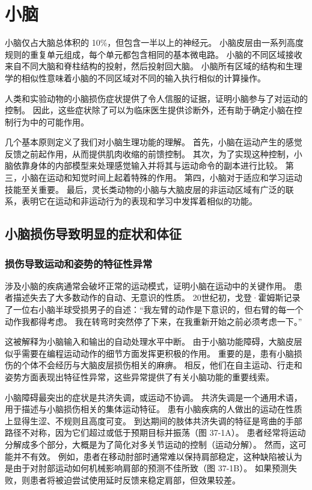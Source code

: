 \chapter{小脑}

小脑仅占大脑总体积的 10\%，但包含一半以上的神经元。 小脑皮层由一系列高度规则的重复单元组成，每个单元都包含相同的基本微电路。 小脑的不同区域接收来自不同大脑和脊柱结构的投射，然后投射回大脑。 小脑所有区域的结构和生理学的相似性意味着小脑的不同区域对不同的输入执行相似的计算操作。

人类和实验动物的小脑损伤症状提供了令人信服的证据，证明小脑参与了对运动的控制。 因此，这些症状除了可以为临床医生提供诊断外，还有助于确定小脑在控制行为中的可能作用。

几个基本原则定义了我们对小脑生理功能的理解。 首先，小脑在运动产生的感觉反馈之前起作用，从而提供肌肉收缩的前馈控制。 其次，为了实现这种控制，小脑依靠身体的内部模型来处理感觉输入并将其与运动命令的副本进行比较。 第三，小脑在运动和知觉时间上起着特殊的作用。 第四，小脑对于适应和学习运动技能至关重要。 最后，灵长类动物的小脑与大脑皮层的非运动区域有广泛的联系，表明它在运动和非运动行为的表现和学习中发挥着相似的功能。


\section{小脑损伤导致明显的症状和体征}
\subsection{损伤导致运动和姿势的特征性异常}
涉及小脑的疾病通常会破坏正常的运动模式，证明小脑在运动中的关键作用。 患者描述失去了大多数动作的自动、无意识的性质。 20世纪初，戈登·霍姆斯记录了一位右小脑半球受损男子的自述：“我左臂的动作是下意识的，但右臂的每一个动作我都得考虑。 我在转弯时突然停了下来，在我重新开始之前必须考虑一下。”

这被解释为小脑输入和输出的自动处理水平中断。 由于小脑功能障碍，大脑皮层似乎需要在编程运动动作的细节方面发挥更积极的作用。 重要的是，患有小脑损伤的个体不会经历与大脑皮层损伤相关的麻痹。 相反，他们在自主运动、行走和姿势方面表现出特征性异常，这些异常提供了有关小脑功能的重要线索。

小脑障碍最突出的症状是共济失调，或运动不协调。 共济失调是一个通用术语，用于描述与小脑损伤相关的集体运动特征。 患有小脑疾病的人做出的运动在性质上显得生涩、不规则且高度可变。 到达期间的肢体共济失调的特征是弯曲的手部路径不对称，因为它们超过或低于预期目标并振荡（图 37-1A）。 患者经常将运动分解成多个部分，大概是为了简化对多关节运动的控制（运动分解）。 然而，这可能并不有效。 例如，患者在移动肘部时通常难以保持肩部稳定，这种缺陷被认为是由于对肘部运动如何机械影响肩部的预测不佳所致（图 37-1B）。 如果预测失败，则患者将被迫尝试使用延时反馈来稳定肩部，但效果较差。

